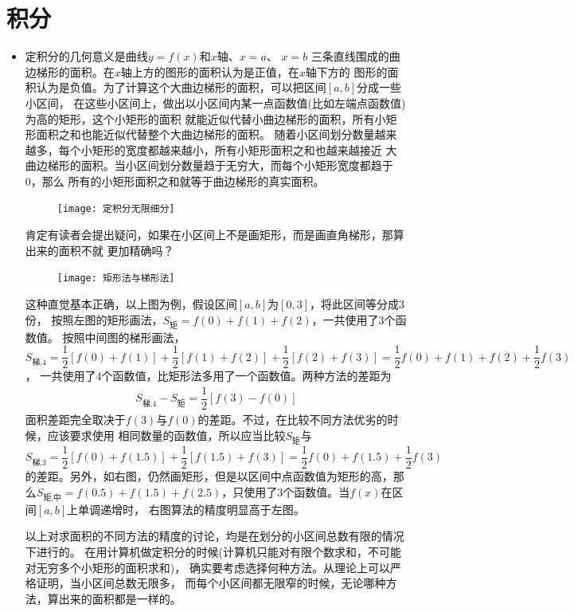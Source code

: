 \section{积分}
\begin{itemize}[leftmargin=\inteval{\myitemleftmargin}pt,itemsep=
   \inteval{\myitemitempsep}pt,topsep=\inteval{\myitemtopsep}pt]
\item 定积分的几何意义是曲线$ y=f(x) $和$ x $轴、$ x=a $、 $ x=b $
三条直线围成的曲边梯形的面积。在$ x $轴上方的图形的面积认为是正值，在$ x $轴下方的
图形的面积认为是负值。为了计算这个大曲边梯形的面积，可以把区间$ [a,b] $分成一些小区间，
在这些小区间上，做出以小区间内某一点函数值(比如左端点函数值)为高的矩形，这个小矩形的面积
就能近似代替小曲边梯形的面积，所有小矩形面积之和也能近似代替整个大曲边梯形的面积。
随着小区间划分数量越来越多，每个小矩形的宽度都越来越小，所有小矩形面积之和也越来越接近
大曲边梯形的面积。当小区间划分数量趋于无穷大，而每个小矩形宽度都趋于0，那么
所有的小矩形面积之和就等于曲边梯形的真实面积。
\begin{figure}[h]
    \centering
    \texttt{[image: 定积分无限细分]}
\end{figure}

肯定有读者会提出疑问，如果在小区间上不是画矩形，而是画直角梯形，那算出来的面积不就
更加精确吗？
\begin{figure}[h]
    \centering
    \texttt{[image: 矩形法与梯形法]}
\end{figure}

这种直觉基本正确，以上图为例，假设区间$ [a,b] $为$ [0,3] $，将此区间等分成3份，
按照左图的矩形画法，$ S_{\text{矩}}=f(0)+f(1)+f(2) $，一共使用了3个函数值。
按照中间图的梯形画法，$ S_{\text{梯,4}}= \dfrac{1}{2}[f(0)+f(1)]+\dfrac{1}{2}
[f(1)+f(2)]+\dfrac{1}{2}[f(2)+f(3)]=\dfrac{1}{2}f(0)+f(1)+f(2)+\dfrac{1}{2}f(3) $，
一共使用了4个函数值，比矩形法多用了一个函数值。两种方法的差距为
\begin{gather*}
    S_{\text{梯,4}}-S_{\text{矩}}=\dfrac{1}{2}[f(3)-f(0)]
\end{gather*}
面积差距完全取决于$ f(3) $与$ f(0) $的差距。不过，在比较不同方法优劣的时候，应该要求使用
相同数量的函数值，所以应当比较$ S_{\text{矩}} $与$ S_{\text{梯,3}}=\dfrac{1}{2}
[f(0)+f(1.5)]+\dfrac{1}{2}[f(1.5)+f(3)]=\dfrac{1}{2}f(0)+f(1.5)+\dfrac{1}{2}f(3) $ 
的差距。另外，如右图，仍然画矩形，但是以区间中点函数值为矩形的高，那么$ S_{\text{矩,中}}
=f(0.5)+f(1.5)+f(2.5) $，只使用了3个函数值。当$ f(x) $在区间$ [a,b] $上单调递增时，
右图算法的精度明显高于左图。

以上对求面积的不同方法的精度的讨论，均是在划分的小区间总数有限的情况下进行的。
在用计算机做定积分的时候(计算机只能对有限个数求和，不可能对无穷多个小矩形的面积求和)，
确实要考虑选择何种方法。从理论上可以严格证明，当小区间总数无限多，
而每个小区间都无限窄的时候，无论哪种方法，算出来的面积都是一样的。


\end{itemize}
